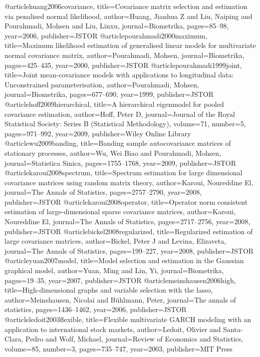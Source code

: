 @article{huang2006covariance,
  title={Covariance matrix selection and estimation via penalised normal likelihood},
  author={Huang, Jianhua Z and Liu, Naiping and Pourahmadi, Mohsen and Liu, Linxu},
  journal={Biometrika},
  pages={85--98},
  year={2006},
  publisher={JSTOR}
}
@article{pourahmadi2000maximum,
  title={Maximum likelihood estimation of generalised linear models for multivariate normal covariance matrix},
  author={Pourahmadi, Mohsen},
  journal={Biometrika},
  pages={425--435},
  year={2000},
  publisher={JSTOR}
}
@article{pourahmadi1999joint,
  title={Joint mean-covariance models with applications to longitudinal data: Unconstrained parameterisation},
  author={Pourahmadi, Mohsen},
  journal={Biometrika},
  pages={677--690},
  year={1999},
  publisher={JSTOR}
}
@article{hoff2009hierarchical,
  title={A hierarchical eigenmodel for pooled covariance estimation},
  author={Hoff, Peter D},
  journal={Journal of the Royal Statistical Society: Series B (Statistical Methodology)},
  volume={71},
  number={5},
  pages={971--992},
  year={2009},
  publisher={Wiley Online Library}
}
@article{wu2009banding,
  title={Banding sample autocovariance matrices of stationary processes},
  author={Wu, Wei Biao and Pourahmadi, Mohsen},
  journal={Statistica Sinica},
  pages={1755--1768},
  year={2009},
  publisher={JSTOR}
}
@article{karoui2008spectrum,
  title={Spectrum estimation for large dimensional covariance matrices using random matrix theory},
  author={Karoui, Noureddine El},
  journal={The Annals of Statistics},
  pages={2757--2790},
  year={2008},
  publisher={JSTOR}
}
@article{karoui2008operator,
  title={Operator norm consistent estimation of large-dimensional sparse covariance matrices},
  author={Karoui, Noureddine El},
  journal={The Annals of Statistics},
  pages={2717--2756},
  year={2008},
  publisher={JSTOR}
}
@article{bickel2008regularized,
  title={Regularized estimation of large covariance matrices},
  author={Bickel, Peter J and Levina, Elizaveta},
  journal={The Annals of Statistics},
  pages={199--227},
  year={2008},
  publisher={JSTOR}
}
@article{yuan2007model,
  title={Model selection and estimation in the Gaussian graphical model},
  author={Yuan, Ming and Lin, Yi},
  journal={Biometrika},
  pages={19--35},
  year={2007},
  publisher={JSTOR}
}
@article{meinshausen2006high,
  title={High-dimensional graphs and variable selection with the lasso},
  author={Meinshausen, Nicolai and B{\"u}hlmann, Peter},
  journal={The annals of statistics},
  pages={1436--1462},
  year={2006},
  publisher={JSTOR}
}
@article{ledoit2003flexible,
  title={Flexible multivariate GARCH modeling with an application to international stock markets},
  author={Ledoit, Olivier and Santa-Clara, Pedro and Wolf, Michael},
  journal={Review of Economics and Statistics},
  volume={85},
  number={3},
  pages={735--747},
  year={2003},
  publisher={MIT Press}
}
